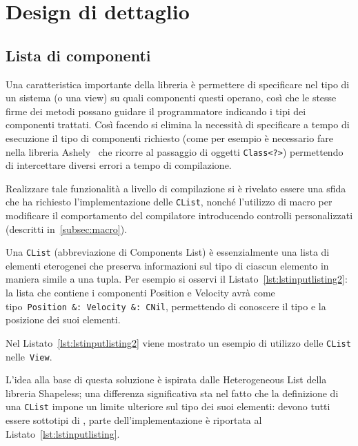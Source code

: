 \chapter{Design di dettaglio}\label{ch:design-di-dettaglio}

\section{Lista di componenti}\label{sec:lista-di-componenti}
Una caratteristica importante della libreria è permettere di specificare nel tipo di un sistema (o una view)
su quali componenti questi operano, così che le stesse firme dei metodi possano guidare il programmatore indicando i
tipi dei componenti trattati.
Così facendo si elimina la necessità di specificare a tempo di esecuzione il tipo di componenti richiesto (come per
esempio è necessario fare nella libreria Ashely~\cite{ashley} che ricorre al passaggio di oggetti \texttt{Class<?>})
permettendo di intercettare diversi errori a tempo di compilazione.

Realizzare tale funzionalità a livello di compilazione si è rivelato essere una sfida che ha richiesto l’implementazione
delle \texttt{CList}, nonché l’utilizzo di macro per modificare il comportamento del compilatore introducendo controlli
personalizzati (descritti in~\ref{subsec:macro}).

Una \texttt{CList} (abbreviazione di Components List) è essenzialmente una lista di elementi eterogenei che preserva
informazioni sul tipo di ciascun elemento in maniera simile a una tupla.
Per esempio si osservi il Listato~\ref{lst:lstinputlisting2}: la lista che contiene
i componenti Position e Velocity avrà come tipo~\texttt{Position~\&:~Velocity~\&:~CNil}, permettendo di conoscere il
tipo e la posizione dei suoi elementi.

Nel Listato~\ref{lst:lstinputlisting2} viene mostrato un esempio di utilizzo delle \texttt{CList} nelle~\texttt{View}.


L’idea alla base di questa soluzione è ispirata dalle Heterogeneous List della libreria
Shapeless\cite{shapeless}; una differenza significativa sta nel fatto che la definizione di una \texttt{CList} impone un
limite ulteriore sul tipo dei suoi elementi: devono tutti essere sottotipi di \Component, parte dell’implementazione è
riportata al Listato~\ref{lst:lstinputlisting}.



